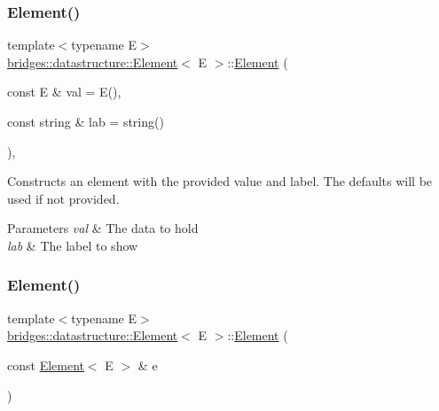\subsubsection{\texorpdfstring{Element()}{Element()}\hspace{0.1cm}{\footnotesize\ttfamily [1/2]}}
{\footnotesize\ttfamily template$<$typename E$>$ \\
\mbox{\hyperlink{classbridges_1_1datastructure_1_1_element}{bridges\+::datastructure\+::\+Element}}$<$ E $>$\+::\mbox{\hyperlink{classbridges_1_1datastructure_1_1_element}{Element}} (\begin{DoxyParamCaption}\item[{const E \&}]{val = {\ttfamily E()},  }\item[{const string \&}]{lab = {\ttfamily string()} }\end{DoxyParamCaption})\hspace{0.3cm}{\ttfamily [inline]}, {\ttfamily [explicit]}}

Constructs an element with the provided value and label. The defaults will be used if not provided.


\begin{DoxyParams}{Parameters}
{\em val} & The data to hold \\
\hline
{\em lab} & The label to show \\
\hline
\end{DoxyParams}
\mbox{\label{classbridges_1_1datastructure_1_1_element_a80eb6ac6925c4974c2e88e7e1446e231}} 
\subsubsection{\texorpdfstring{Element()}{Element()}\hspace{0.1cm}{\footnotesize\ttfamily [2/2]}}
{\footnotesize\ttfamily template$<$typename E$>$ \\
\mbox{\hyperlink{classbridges_1_1datastructure_1_1_element}{bridges\+::datastructure\+::\+Element}}$<$ E $>$\+::\mbox{\hyperlink{classbridges_1_1datastructure_1_1_element}{Element}} (\begin{DoxyParamCaption}\item[{const \mbox{\hyperlink{classbridges_1_1datastructure_1_1_element}{Element}}$<$ E $>$ \&}]{e }\end{DoxyParamCaption})\hspace{0.3cm}{\ttfamily [inline]}}

